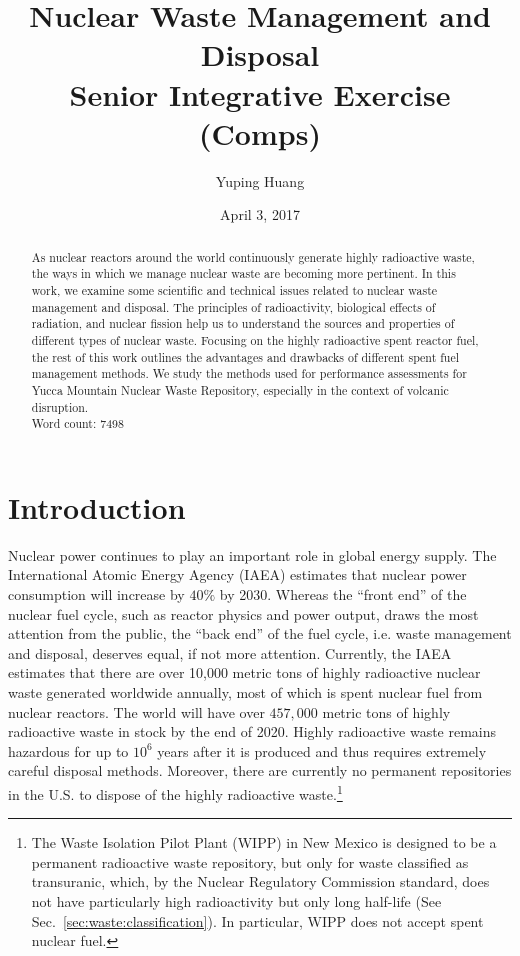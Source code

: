 \documentclass[nofootinbib,preprint,aps]{revtex4-1}
\begin{document}
\title{Nuclear Waste Management and Disposal\\
\normalsize Senior Integrative Exercise (Comps)}

\author{Yuping Huang}%

\date{April 3, 2017}%
\begin{abstract}
    As nuclear reactors around the world continuously generate highly radioactive waste,
    the ways in which we manage nuclear waste are becoming more pertinent. In this work,
    we examine some scientific and technical issues related to nuclear waste management and disposal.
    The principles of radioactivity, biological effects of radiation, and nuclear fission help us to understand the sources and properties
    of different types of nuclear waste. Focusing on the highly radioactive spent reactor fuel, the rest
    of this work outlines the advantages and drawbacks of different spent fuel management
    methods. We study the methods used for performance assessments for Yucca Mountain Nuclear Waste Repository,
    especially in the context of volcanic disruption.\\
    Word count: 7498
\end{abstract}
\maketitle
\tableofcontents
\newpage
\section{Introduction}
Nuclear power continues to play an important role in global energy supply.
The International Atomic Energy Agency (IAEA) estimates that nuclear power
consumption will increase by $40\%$ by 2030.\cite{iaea12}
Whereas the ``front end'' of the nuclear fuel cycle, such as reactor physics and power output, draws
the most attention from the public, the ``back end'' of the fuel cycle, i.e. waste management and
disposal, deserves equal, if not more attention.
Currently, the IAEA estimates that there are over 10,000 metric tons of highly radioactive nuclear waste 
generated worldwide annually,
most of which is spent nuclear fuel from nuclear reactors.\cite{iaea08, r12}
The world will have over $457,000$ metric tons of highly radioactive waste in stock by the end of 2020.\cite{r12}
Highly radioactive waste remains hazardous for up to $10^6$ years after it is produced and thus
requires extremely careful disposal methods.
Moreover, there are currently no permanent repositories in the U.S. to dispose of the highly radioactive
waste.\footnote{The Waste Isolation Pilot Plant (WIPP) in New Mexico is designed to be a permanent radioactive
    waste repository, but only
for waste classified as transuranic, which, by the Nuclear Regulatory Commission standard, does not have particularly
high radioactivity but only long half-life (See Sec.~\ref{sec:waste:classification}). In particular, WIPP does not accept spent nuclear fuel.\cite[chapt. 4]{aa12}}  
\end{document}
